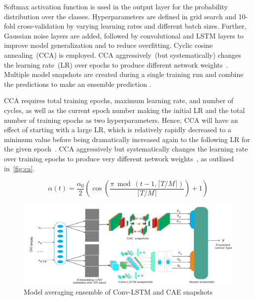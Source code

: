 \hspace*{3.5mm} Softmax activation function is used in the output layer for the probability distribution over the classes. Hyperparameters are defined in grid search and 10-fold cross-validation by varying learning rates and different batch sizes. Further, Gaussian noise layers are added, followed by convolutional and LSTM layers to improve model generalization and to reduce overfitting. 
Cyclic cosine annealing~(CCA) is employed. CCA  aggressively~(but systematically) changes the learning rate~(LR) over epochs to produce different network weights~\cite{loshchilov2016sgdr}. Multiple model snapshots are created during a single training run and combine the predictions to make an ensemble prediction \cite{huang2017snapshot}. 

\hspace*{3.5mm} CCA requires total training epochs, maximum learning rate, and number of cycles, as well as the current epoch number making the initial LR and the total number of training epochs as two hyperparameters. Hence, CCA will have an effect of starting with a large LR, which is relatively rapidly decreased to a minimum value before being dramatically increased again to the following LR for the given epoch~\cite{huang2017snapshot}. CCA aggressively but systematically changes the learning rate over training epochs to produce very different network weights~\cite{loshchilov2016sgdr}, as outlined in~\cref{fig:ca}. 

\begin{equation}
    \label{eq:lr-cosine}
    \alpha(t)=\frac{\alpha_{0}}{2}\left(\cos \left(\frac{\pi \bmod (t-1,\lceil T / M\rceil)}{\lceil T / M\rceil}\right)+1\right)
\end{equation}

\begin{figure}
    \centering
        \includegraphics[scale=0.65]{images/ensemble.png}
    \caption{Model averaging ensemble of Conv-LSTM and CAE snapshots~\cite{karimACCA2019}}
    \label{fig:mae}
    \vspace{-2mm}
\end{figure}

